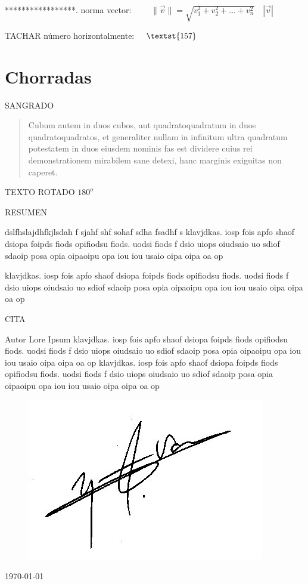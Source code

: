 *****************. norma vector: $\qquad \|\vec{v}\|=\sqrt{v_1^2+v_2^2+\ldots+v_n^2} \quad |\vec v|$


TACHAR número horizontalmente: $\quad \text{\textst{157}}$

\section{Chorradas}
\vspace{10mm}
\begin{center}
\end{center}

SANGRADO
\begin{quotation}
\begin{textit} %
Cubum autem in duos cubos, aut quadratoquadratum in duos quadratoquadratos, et
generaliter nullam in infinitum ultra quadratum potestatem in duos eiusdem nominis fas
est dividere cuius rei demonstrationem mirabilem sane detexi, hanc marginis exiguitas non
caperet.
\end{textit}
\end{quotation}


TEXTO ROTADO $180^o$




RESUMEN

\begin{resumen}
	dslfhslajdhfkjlsdah f sjahf shf sohaf sdha fsadhf s klavjdkas.  iosp fois apfo shaof dsiopa foipds fiods opifiodsu fiods. uodsi fiods f dsio uiops oiudsaio  uo sdiof sdaoip posa opia oipaoipu opa iou iou usaio oipa oipa oa op

klavjdkas.  iosp fois apfo shaof dsiopa foipds fiods opifiodsu fiods. uodsi fiods f dsio uiops oiudsaio  uo sdiof sdaoip posa opia oipaoipu opa iou iou usaio oipa oipa oa op
\end{resumen}




CITA

\begin{cita}{Autor Lore Ipsum}
	klavjdkas.  iosp fois apfo shaof dsiopa foipds fiods opifiodsu fiods. uodsi fiods f dsio uiops oiudsaio  uo sdiof sdaoip posa opia oipaoipu opa iou iou usaio oipa oipa oa op klavjdkas.  iosp fois apfo shaof dsiopa foipds fiods opifiodsu fiods. uodsi fiods f dsio uiops oiudsaio  uo sdiof sdaoip posa opia oipaoipu opa iou iou usaio oipa oipa oa op
\end{cita}


\vspace*{\fill}
\begin{center}
   \begin{figure}[H]
	\centering
	\includegraphics[width=.3
	\textwidth]{imagenes/firma.png}
\end{figure}
\today{}
\end{center}
\vspace{3cm}
